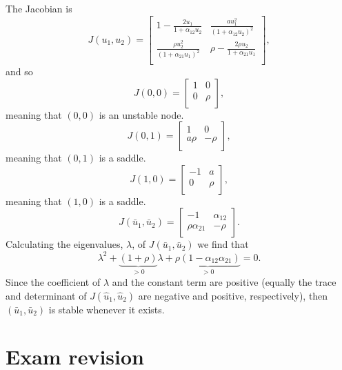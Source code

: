 \documentclass[]{article}
\newcommand{\bb}{\begin{equation}}
\newcommand{\ee}{\end{equation}}
\renewcommand{\l}{\left(}
\renewcommand{\r}{\right)}
\begin{document}
\begin{Answ}
\subsubsection{}
The Jacobian is
\bb
J(u_1,u_2)=\left[ {\begin{array}{cc}
   1-\frac{2u_1}{1+\alpha_{12}u_2} & \frac{a u_1^2}{\l 1+\alpha_{12}u_2\r^2} \\
   \frac{\rho u_2^2}{\l 1+\alpha_{21}u_1\r^2} & \rho -\frac{2\rho u_2}{1+\alpha_{21}u_1} \\
  \end{array} } \right],
\ee
and so
\bb
J(0,0)=\left[ {\begin{array}{cc}
   1 & 0 \\
   0 & \rho \\
  \end{array} } \right],
\ee
meaning that $(0,0)$ is an unstable node.
\bb
J(0,1)=\left[ {\begin{array}{cc}
   1 & 0 \\
   a\rho & -\rho \\
  \end{array} } \right],
\ee
meaning that $(0,1)$ is a saddle.
\bb
J(1,0)=\left[ {\begin{array}{cc}
   -1 & a \\
   0 & \rho \\
  \end{array} } \right],
\ee
meaning that $(1,0)$ is a saddle.
\bb
J(\bar{u}_1,\bar{u}_2)=\left[ {\begin{array}{cc}
   -1 & \alpha_{12} \\
   \rho\alpha_{21} & -\rho \\
  \end{array} } \right].
\ee
Calculating the eigenvalues, $\lambda$, of $J(\bar{u}_1,\bar{u}_2)$ we find that
\bb
\lambda^2 +\underbrace{(1+\rho)}_{>0}\lambda+\underbrace{\rho(1-\alpha_{12}\alpha_{21})}_{>0}=0.
\ee
Since the coefficient of $\lambda$ and the constant term are positive (equally the trace and determinant of $J(\hat{u}_1,\hat{u}_2)$ are negative and positive, respectively), then $(\bar{u}_1,\bar{u}_2)$ is stable whenever it exists.
\end{Answ}

\section*{Exam revision}
\end{document}
